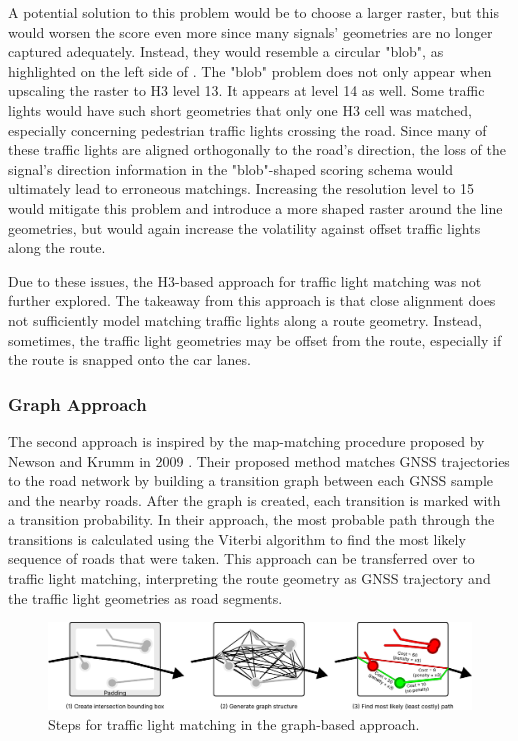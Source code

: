 A potential solution to this problem would be to choose a larger raster, but this would worsen the score even more since many signals' geometries are no longer captured adequately. Instead, they would resemble a circular "blob", as highlighted on the left side of . The "blob" problem does not only appear when upscaling the raster to H3 level 13. It appears at level 14 as well. Some traffic lights would have such short geometries that only one H3 cell was matched, especially concerning pedestrian traffic lights crossing the road. Since many of these traffic lights are aligned orthogonally to the road's direction, the loss of the signal's direction information in the "blob"-shaped scoring schema would ultimately lead to erroneous matchings. Increasing the resolution level to 15 would mitigate this problem and introduce a more shaped raster around the line geometries, but would again increase the volatility against offset traffic lights along the route.

Due to these issues, the H3-based approach for traffic light matching was not further explored. The takeaway from this approach is that close alignment does not sufficiently model matching traffic lights along a route geometry. Instead, sometimes, the traffic light geometries may be offset from the route, especially if the route is snapped onto the car lanes.

\subsubsection{Graph Approach}

The second approach is inspired by the map-matching procedure proposed by Newson and Krumm in 2009 \cite{newson_hidden_2009}. Their proposed method matches GNSS trajectories to the road network by building a transition graph between each GNSS sample and the nearby roads. After the graph is created, each transition is marked with a transition probability. In their approach, the most probable path through the transitions is calculated using the Viterbi algorithm to find the most likely sequence of roads that were taken. This approach can be transferred over to traffic light matching, interpreting the route geometry as GNSS trajectory and the traffic light geometries as road segments.

\begin{figure}[htbp]
\centering
\includegraphics[width=\linewidth]{images/sg-selection-graph-approach.pdf}
\caption{Steps for traffic light matching in the graph-based approach.}
\label{fig:sg-selection-graph-approach}
\end{figure}

